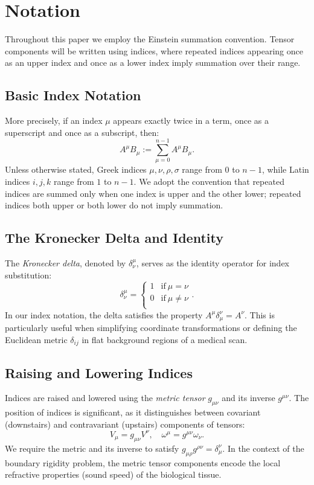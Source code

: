 \section{Notation}
\label{sec:notation}

Throughout this paper we employ the Einstein summation convention. Tensor components will be written using indices, where repeated indices appearing once as an upper index and once as a lower index imply summation over their range.

\subsection{Basic Index Notation} More precisely, if an index $\mu$ appears exactly twice in a term, once as a superscript and once as a subscript, then:
\[%
  A^\mu B_\mu := \sum_{\mu=0}^{n-1} A^\mu B_\mu
.\]%
Unless otherwise stated, Greek indices $\mu, \nu, \rho, \sigma$ range from $0$ to $n-1$, while Latin indices $i, j, k$ range from $1$ to $n-1$. We adopt the convention that repeated indices are summed only when one index is upper and the other lower; repeated indices both upper or both lower do not imply summation.

\subsection{The Kronecker Delta and Identity} The \emph{Kronecker delta}, denoted by $\delta^\mu_\nu$, serves as the identity operator for index substitution:
\[%
  \delta^\mu_\nu = \begin{cases}
    1 & \text{if}~\mu = \nu \\
    0 & \text{if}~\mu \neq \nu \\
  \end{cases}
.\]%
In our index notation, the delta satisfies the property $A^\mu \delta^\nu_\mu = A^\nu$. This is particularly useful when simplifying coordinate transformations or defining the Euclidean metric $\delta_{ij}$ in flat background regions of a medical scan.

\subsection{Raising and Lowering Indices} Indices are raised and lowered using the \emph{metric tensor} $g_{\mu\nu}$ and its inverse $g^{\mu\nu}$. The position of indices is significant, as it distinguishes between covariant (downstairs) and contravariant (upstairs) components of tensors:
\[%
  V_\mu = g_{\mu\nu} V^\nu, \quad \omega^\mu = g^{\mu\nu} \omega_\nu
.\]%
We require the metric and its inverse to satisfy $g_{\mu\rho}g^{\rho\nu} = \delta_\mu^\nu$. In the context of the boundary rigidity problem, the metric tensor components encode the local refractive properties (sound speed) of the biological tissue.

